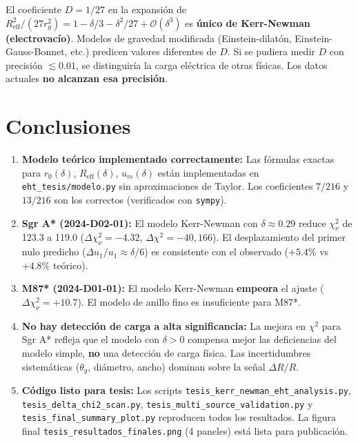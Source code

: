 \documentclass[12pt,a4paper]{article}
\begin{document}
El coeficiente $D = 1/27$ en la expansión de $R_{\text{eff}}^2/(27r_g^2) = 1 - \delta/3 - \delta^2/27 + \mathcal{O}(\delta^3)$ es \textbf{único de Kerr-Newman (electrovacío)}. Modelos de gravedad modificada (Einstein-dilatón, Einstein-Gauss-Bonnet, etc.) predicen valores diferentes de $D$. Si se pudiera medir $D$ con precisión $\lesssim 0.01$, se distinguiría la carga eléctrica de otras físicas. Los datos actuales \textbf{no alcanzan esa precisión}.

\section{Conclusiones}

\begin{enumerate}
    \item \textbf{Modelo teórico implementado correctamente:} Las fórmulas exactas para $r_0(\delta)$, $R_{\text{eff}}(\delta)$, $u_m(\delta)$ están implementadas en \texttt{eht\_tesis/modelo.py} sin aproximaciones de Taylor. Los coeficientes $7/216$ y $13/216$ son los correctos (verificados con \texttt{sympy}).

    \item \textbf{Sgr A* (2024-D02-01):} El modelo Kerr-Newman con $\delta \approx 0.29$ reduce $\chi^2_\nu$ de 123.3 a 119.0 ($\Delta\chi^2_\nu = -4.32$, $\Delta\chi^2 = -40,166$). El desplazamiento del primer nulo predicho ($\Delta u_1/u_1 \approx \delta/6$) es consistente con el observado ($+5.4\%$ vs $+4.8\%$ teórico).

    \item \textbf{M87* (2024-D01-01):} El modelo Kerr-Newman \textbf{empeora} el ajuste ($\Delta\chi^2_\nu = +10.7$). El modelo de anillo fino es insuficiente para M87*.

    \item \textbf{No hay detección de carga a alta significancia:} La mejora en $\chi^2$ para Sgr A* refleja que el modelo con $\delta>0$ compensa mejor las deficiencias del modelo simple, \textbf{no} una detección de carga física. Las incertidumbres sistemáticas ($\theta_g$, diámetro, ancho) dominan sobre la señal $\Delta R/R$.

    \item \textbf{Código listo para tesis:} Los scripts \texttt{tesis\_kerr\_newman\_eht\_analysis.py}, \texttt{tesis\_delta\_chi2\_scan.py}, \texttt{tesis\_multi\_source\_validation.py} y \texttt{tesis\_final\_summary\_plot.py} reproducen todos los resultados. La figura final \texttt{tesis\_resultados\_finales.png} (4 paneles) está lista para publicación.
\end{enumerate}
\end{document}
